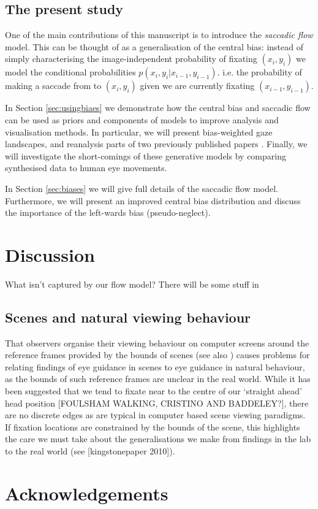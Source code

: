 \documentclass[a4paper, twocolumn, oneside, 10pt]{article}
\begin{document}
\subsection{The present study}

One of the main contributions of this manuscript is to introduce the \textit{saccadic flow} model. This can be thought of as a generalisation of the central bias: instead of simply characterising the image-independent probability of fixating $(x_i, y_i)$ we model the conditional probabilities $p(x_i,y_i|x_{i-1}, y_{i-1})$. i.e. the probability of making a saccade from to $(x_i,y_i)$ given we are currently fixating $(x_{i-1}, y_{i-1})$.

In Section \ref{sec:usingbiaes} we demonstrate how the central bias and saccadic flow can be used as priors and components of models to improve analysis and visualisation methods. In particular, we will present bias-weighted gaze landscapes, and reanalysis parts of two previously published papers \citep{clarke2013,ehinger2009}. Finally, we will investigate the short-comings of these generative models by comparing synthesised data to human eye movements. 

In Section \ref{sec:biases} we will give full details of the saccadic flow model. Furthermore, we will present an improved central bias distribution and discuss the importance of the left-wards bias (pseudo-neglect).






\section{Discussion}


What isn't captured by our flow model? There will be some stuff in \cite{macinnes2014}

\subsection{Scenes and natural viewing behaviour}
That observers organise their viewing behaviour on computer screens around the reference frames provided by the bounds of scenes (see also \cite{Stainer:2013ce}) causes problems for relating findings of eye guidance in scenes to eye guidance in natural behaviour, as the bounds of such reference frames are unclear in the real world. While it has been suggested that we tend to fixate near to the centre of our `straight ahead' head position [FOULSHAM WALKING, CRISTINO AND BADDELEY?], there are no discrete edges as are typical in computer based scene viewing paradigms. If fixation locations are constrained by the bounds of the scene, this highlights the care we must take about the generalisations we make from findings in the lab to the real world (see [kingstonepaper 2010]). 


\section*{Acknowledgements}


\appendix



\small

\end{document}
